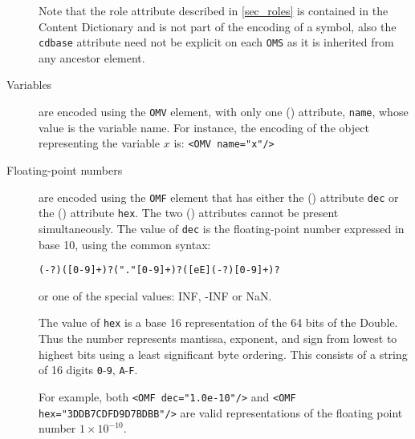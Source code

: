 \begin{description}
  Note that the role attribute described in \ref{sec_roles} is contained in the Content
  Dictionary and is not part of the encoding of a symbol, also the \lstinline|cdbase|
  attribute need not be explicit on each \lstinline|OMS| as it is inherited from any
  ancestor element.
\item[Variables] are encoded using the \lstinline|OMV| element, with only one (\XML)
  attribute, \lstinline|name|, whose value is the variable name. For instance, the
  encoding of the object representing the variable $x$ is: \lstinline|<OMV name="x"/>|
\item[Floating-point numbers] are encoded using the \lstinline|OMF| element that has
  either the (\XML) attribute \lstinline|dec| or the (\XML) attribute \lstinline|hex|. The
  two (\XML) attributes cannot be present simultaneously. The value of \lstinline|dec| is
  the floating-point number expressed in base 10, using the common syntax:

\begin{lstlisting}
(-?)([0-9]+)?("."[0-9]+)?([eE](-?)[0-9]+)?
\end{lstlisting}

or one of the special values: INF, -INF or NaN.

The value of \lstinline|hex| is a base 16 representation of the 64 bits of the
 Double.  Thus the number represents mantissa, exponent, and sign from
lowest to highest bits using a least significant byte ordering.  This consists of a string
of 16 digits \lstinline|0|-\lstinline|9|, \lstinline|A|-\lstinline|F|.
  

For example, both \lstinline|<OMF dec="1.0e-10"/>| and 
\lstinline|<OMF hex="3DDB7CDFD9D7BDBB"/>|
are valid representations of the floating point number $1\times 10^{-10}$.
 

\end{description}
